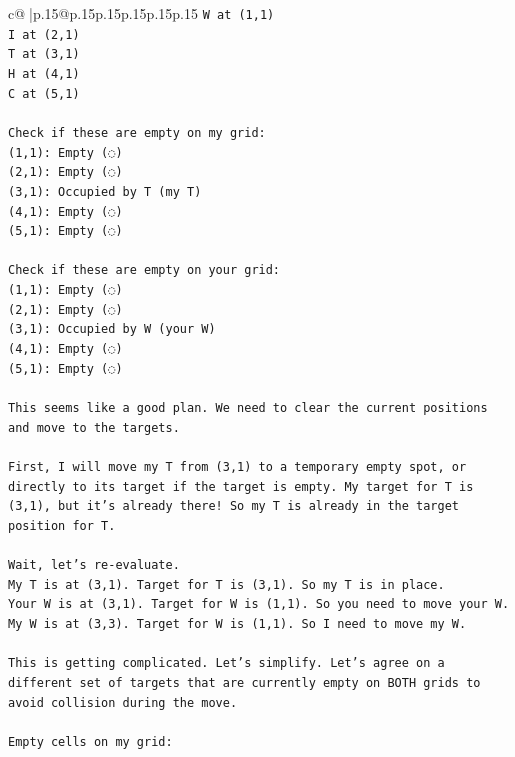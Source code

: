\documentclass{article}
\begin{document}
{\begin{supertabular}{c@{$\;$}|p{.15\linewidth}@{}p{.15\linewidth}p{.15\linewidth}p{.15\linewidth}p{.15\linewidth}p{.15\linewidth}}
{{{\texttt{W at (1,1)} \\
\texttt{I at (2,1)} \\
\texttt{T at (3,1)} \\
\texttt{H at (4,1)} \\
\texttt{C at (5,1)} \\
\\ 
\texttt{Check if these are empty on my grid:} \\
\texttt{(1,1): Empty (◌)} \\
\texttt{(2,1): Empty (◌)} \\
\texttt{(3,1): Occupied by T (my T)} \\
\texttt{(4,1): Empty (◌)} \\
\texttt{(5,1): Empty (◌)} \\
\\ 
\texttt{Check if these are empty on your grid:} \\
\texttt{(1,1): Empty (◌)} \\
\texttt{(2,1): Empty (◌)} \\
\texttt{(3,1): Occupied by W (your W)} \\
\texttt{(4,1): Empty (◌)} \\
\texttt{(5,1): Empty (◌)} \\
\\ 
\texttt{This seems like a good plan. We need to clear the current positions and move to the targets.} \\
\\ 
\texttt{First, I will move my T from (3,1) to a temporary empty spot, or directly to its target if the target is empty. My target for T is (3,1), but it's already there! So my T is already in the target position for T.} \\
\\ 
\texttt{Wait, let's re{-}evaluate.} \\
\texttt{My T is at (3,1). Target for T is (3,1). So my T is in place.} \\
\texttt{Your W is at (3,1). Target for W is (1,1). So you need to move your W.} \\
\texttt{My W is at (3,3). Target for W is (1,1). So I need to move my W.} \\
\\ 
\texttt{This is getting complicated. Let's simplify. Let's agree on a different set of targets that are currently empty on BOTH grids to avoid collision during the move.} \\
\\ 
\texttt{Empty cells on my grid:} \\
}}}
\end{supertabular}}
\end{document}
